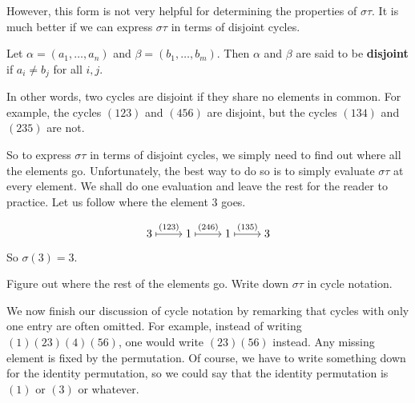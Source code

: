 \documentclass[./main.tex]{subfiles}
\begin{document}
However, this form is not very helpful for determining the properties of
$\sigma\tau$. It is much better if we can express $\sigma \tau$ in terms of
disjoint cycles.

\begin{definition}
    Let $\alpha = (a_1, \dots, a_n)$ and $\beta = (b_1, \dots, b_m)$. Then
    $\alpha$ and $\beta$ are said to be \textbf{disjoint} if $a_i \neq b_j$ for
    all $i, j$.
\end{definition}
In other words, two cycles are disjoint if they share no elements in common. For
example, the cycles $(123)$ and $(456)$ are disjoint, but the cycles $(134)$ and
$(235)$ are not.

So to express $\sigma \tau$ in terms of disjoint cycles, we simply need to find
out where all the elements go. Unfortunately, the best way to do so is to simply
evaluate $\sigma \tau$ at every element. We shall do one evaluation and leave
the rest for the reader to practice. Let us follow where the element 3 goes. 

\[\begin{tikzcd}[cramped]
	3 & 1 & 1 & 3
	\arrow["{(123)}", maps to, from=1-1, to=1-2]
	\arrow["{(246)}", maps to, from=1-2, to=1-3]
	\arrow["{(135)}", maps to, from=1-3, to=1-4]
\end{tikzcd}\]

So $\sigma(3) = 3$.

\begin{exercise}
    Figure out where the rest of the elements go. Write down $\sigma \tau$ in
    cycle notation.
\end{exercise}

We now finish our discussion of cycle notation by remarking that cycles with
only one entry are often omitted. For example, instead of writing
$(1)(23)(4)(56)$, one would write $(23)(56)$ instead. Any missing element is
fixed by the permutation. Of course, we have to write something down for the
identity permutation, so we could say that the identity permutation is $(1)$ or
$(3)$ or whatever.
\end{document}
